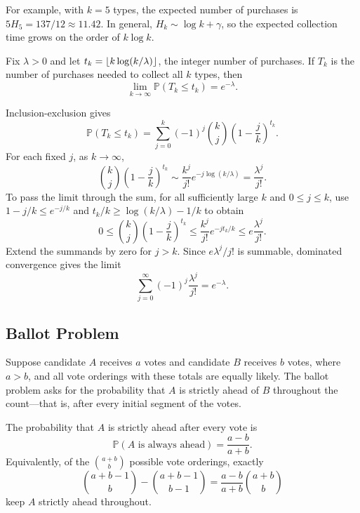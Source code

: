 \documentclass[a4paper,11pt,abstracton]{scrartcl}
\DeclarePairedDelimiter{\floor}{\lfloor}{\rfloor}
\theoremstyle{dotlessP}
\theoremstyle{dotlessS}
\theoremstyle{remark}
\theoremstyle{definition}
\begin{document}
For example, with $k=5$ types, the expected number of purchases is $5H_5=137/12\approx 11.42$. In general, $H_k\sim\log k+\gamma$, so the expected collection time grows on the order of $k\log k$.

\begin{problem_box}
Fix $\lambda>0$ and let $t_k=\floor{k\log(k/\lambda)}$, the integer number of purchases. If $T_k$ is the number of purchases needed to collect all $k$ types, then
\[
  \lim_{k\to\infty}\mathbb{P}(T_k\leq t_k)=e^{-\lambda}.
\]
\end{problem_box}

\begin{claim_box}
Inclusion-exclusion gives
\[
  \mathbb{P}(T_k\leq t_k)
  =\sum_{j=0}^{k}(-1)^j\binom{k}{j}\left(1-\frac{j}{k}\right)^{t_k}.
\]
For each fixed $j$, as $k\to\infty$,
\[
  \binom{k}{j}\left(1-\frac{j}{k}\right)^{t_k}
  \sim \frac{k^j}{j!}e^{-j\log(k/\lambda)}
  =\frac{\lambda^j}{j!}.
\]
To pass the limit through the sum, for all sufficiently large $k$ and $0\leq j\leq k$, use $1-j/k\leq e^{-j/k}$ and $t_k/k\geq\log(k/\lambda)-1/k$ to obtain
\[
  0\leq\binom{k}{j}\left(1-\frac{j}{k}\right)^{t_k}
  \leq\frac{k^j}{j!}e^{-jt_k/k}
  \leq e\frac{\lambda^j}{j!}.
\]
Extend the summands by zero for $j>k$. Since $e\lambda^j/j!$ is summable, dominated convergence gives the limit
\[
  \sum_{j=0}^{\infty}(-1)^j\frac{\lambda^j}{j!}=e^{-\lambda}.
\]
\end{claim_box}

\subsection{Ballot Problem}

Suppose candidate $A$ receives $a$ votes and candidate $B$ receives $b$ votes, where $a>b$, and all vote orderings with these totals are equally likely. The ballot problem asks for the probability that $A$ is strictly ahead of $B$ throughout the count—that is, after every initial segment of the votes.

\begin{problem_box}
The probability that $A$ is strictly ahead after every vote is
\[
  \mathbb{P}(A\text{ is always ahead})=\frac{a-b}{a+b}.
\]
Equivalently, of the $\binom{a+b}{b}$ possible vote orderings, exactly
\[
  \binom{a+b-1}{b}-\binom{a+b-1}{b-1}
  =\frac{a-b}{a+b}\binom{a+b}{b}
\]
keep $A$ strictly ahead throughout.
\end{problem_box}
\end{document}
